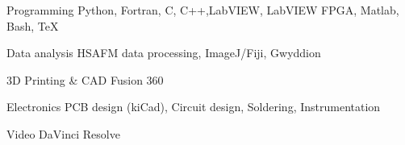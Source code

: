 
\begin{cvskills}

	\cvskill
	{Programming}
    {Python, Fortran, C, C++,LabVIEW, LabVIEW FPGA, Matlab, Bash, \TeX}

	\cvskill
	{Data analysis}
    {HSAFM data processing, ImageJ/Fiji, Gwyddion}

    \cvskill
    {3D Printing \& CAD}
    {Fusion 360}

    \cvskill
    {Electronics}
    {PCB design (kiCad), Circuit design, Soldering, Instrumentation}







    \cvskill
    {Video}
    {DaVinci Resolve}

\end{cvskills}
